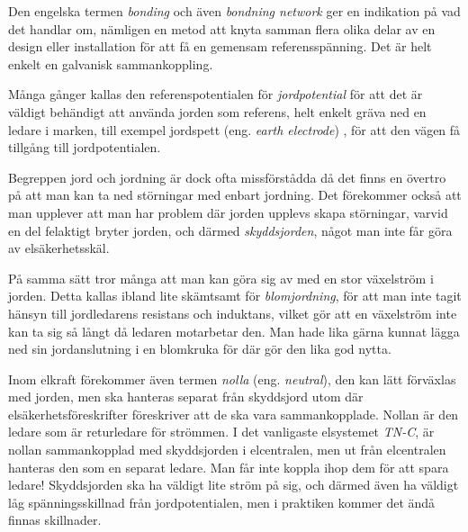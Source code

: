 Den engelska termen \emph{bonding} och även \emph{bondning network} ger en
indikation på vad det handlar om, nämligen en metod att knyta samman flera
olika delar av en design eller installation för att få en gemensam
referensspänning.
Det är helt enkelt en galvanisk sammankoppling.

Många gånger kallas den referenspotentialen för \emph{jordpotential} för att
det är väldigt behändigt att använda jorden som referens, helt enkelt gräva ned
en ledare i marken, till exempel jordspett (eng. \emph{earth electrode})
\cite[kap 3.1.2]{K27-1991}, för att den vägen få tillgång till jordpotentialen.

Begreppen jord och jordning är dock ofta missförstådda då det finns en övertro
på att man kan ta ned störningar med enbart jordning.
Det förekommer också att man upplever att man har problem där jorden upplevs
skapa störningar, varvid en del felaktigt bryter jorden, och därmed
\emph{skyddsjorden}, något man inte får göra av elsäkerhetsskäl.

På samma sätt tror många att man kan göra sig av med en stor växelström i
jorden.
Detta kallas ibland lite skämtsamt för \emph{blomjordning}, för att man inte
tagit hänsyn till jordledarens resistans och induktans, vilket gör att en
växelström inte kan ta sig så långt då ledaren motarbetar den.
Man hade lika gärna kunnat lägga ned sin jordanslutning i en blomkruka för där
gör den lika god nytta.

Inom elkraft förekommer även termen \emph{nolla} (eng. \emph{neutral}), den
kan lätt förväxlas med jorden, men ska hanteras separat från skyddsjord utom
där elsäkerhetsföreskrifter föreskriver att de ska vara sammankopplade.
Nollan är den ledare som är returledare för strömmen.
I det vanligaste elsystemet \emph{TN-C}, är nollan sammankopplad med skyddsjorden
i elcentralen, men ut från elcentralen hanteras den som en separat ledare.
Man får inte koppla ihop dem för att spara ledare!
Skyddsjorden ska ha väldigt lite ström på sig, och därmed även ha väldigt
låg spänningsskillnad från jordpotentialen, men i praktiken kommer det ändå
finnas skillnader.



